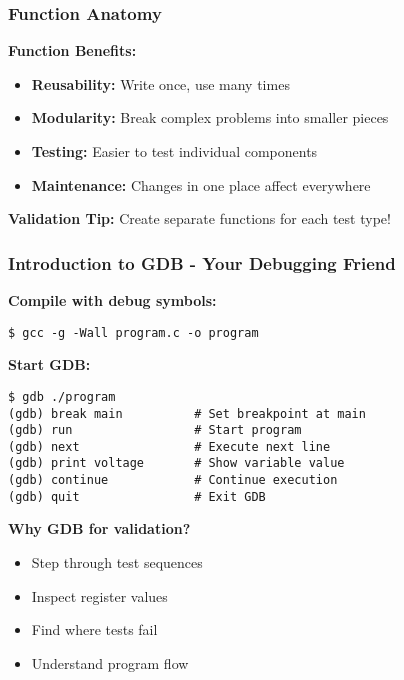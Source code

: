 \documentclass{beamer}
\begin{document}
\begin{frame}
\frametitle{Function Anatomy}
\begin{center}
\end{center}

\textbf{Function Benefits:}
\begin{itemize}
    \item \textbf{Reusability:} Write once, use many times
    \item \textbf{Modularity:} Break complex problems into smaller pieces
    \item \textbf{Testing:} Easier to test individual components
    \item \textbf{Maintenance:} Changes in one place affect everywhere
\end{itemize}

\vspace{0.5cm}
\textbf{Validation Tip:} Create separate functions for each test type!
\end{frame}

\begin{frame}[fragile]
\frametitle{Introduction to GDB - Your Debugging Friend}
\textbf{Compile with debug symbols:}
\begin{verbatim}
$ gcc -g -Wall program.c -o program
\end{verbatim}

\textbf{Start GDB:}
\begin{verbatim}
$ gdb ./program
(gdb) break main          # Set breakpoint at main
(gdb) run                 # Start program
(gdb) next                # Execute next line
(gdb) print voltage       # Show variable value
(gdb) continue            # Continue execution
(gdb) quit                # Exit GDB
\end{verbatim}

\textbf{Why GDB for validation?}
\begin{itemize}
    \item Step through test sequences
    \item Inspect register values
    \item Find where tests fail
    \item Understand program flow
\end{itemize}
\end{frame}
\end{document}
